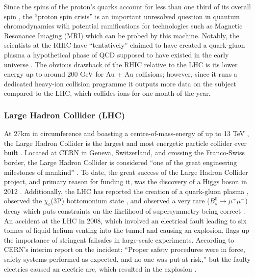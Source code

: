Since the spins of the proton's quarks account for less than one third of its overall spin \cite{PhysLettB:ProtonSpin}, the ``proton spin crisis'' is an important unresolved question in quantum chromodynamics \textendash with potential ramifications for technologies such as Magnetic Resonance Imaging (MRI) \textendash which can be probed by this machine. Notably, the scientists at the RHIC have ``tentatively'' claimed to have created a quark-gluon plasma \cite{NucPhysA:QuarkGluon} \textendash a hypothetical phase of QCD supposed to have existed in the early universe \cite{CERN:QuarkGluonPlasma:Online}. The obvious drawback of the RHIC relative to the LHC is its lower energy \textendash up to around 200 GeV for Au + Au collisions; however, since it runs a dedicated heavy-ion collision programme it outputs more data on the subject compared to the LHC, which collides ions for one month of the year.

\subsubsection{Large Hadron Collider (LHC)}
At 27km in circumference and boasting a centre-of-mass-energy of up to 13 TeV \cite{LHC:14TeV:Online,CERN:14TeV:Online}, the Large Hadron Collider is the largest and most energetic particle collider ever built \cite{LHC:Home}. Located at CERN in Geneva, Switzerland, and crossing the Franco-Swiss border, the Large Hadron Collider is considered ``one of the great engineering milestones of mankind'' \cite{LHC:Milestone:Online}. To date, the great success of the Large Hadron Collider project, and primary reason for funding it, was the discovery of a Higgs boson in 2012 \cite{PhysLettB:Higgs:ATLAS,PhysLettB:Higgs:CMS}. Additionally, the LHC has reported the creation of a quark-gluon plasma \cite{NatGeo:QuarkGluon:Online}, observed the $\chi_{b}$(3P) bottomonium state \cite{arXiv:ATLAS:Bottomonium}, and observed a very rare ($B_{s}^{0} \rightarrow \mu^{+}\mu^{-}$) decay which puts constraints on the likelihood of supersymmetry being correct \cite{BBC:SUSY}. An accident at the LHC in 2008, which involved an electrical fault leading to six tonnes of liquid helium venting into the tunnel and causing an explosion, flags up the importance of stringent failsafes in large-scale experiments. \cite{BBC:MagnetQuench:Online} According to CERN's interim report on the incident: ``Proper safety procedures were in force, safety 
systems performed as expected, and no one was put at risk,'' but the faulty electrics caused an electric arc, which resulted in the explosion \cite{CERN:IncidentReport}.

